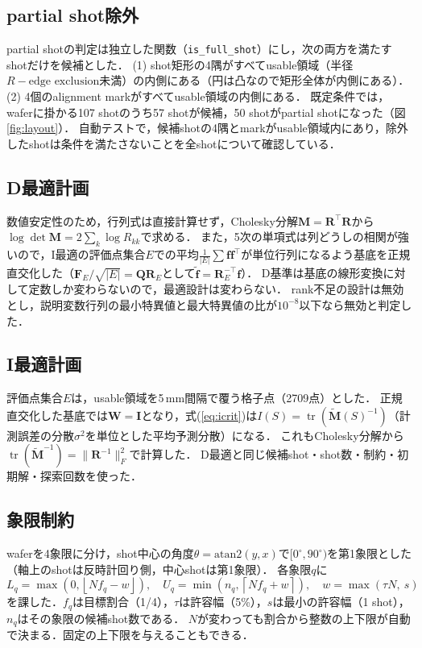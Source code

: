 \documentclass[10.5pt,a4paper]{ltjsarticle}
\DeclareMathOperator{\tr}{tr}
\begin{document}
\subsection{partial shot除外}

partial shotの判定は独立した関数（\texttt{is\_full\_shot}）にし，次の両方を満たすshotだけを候補とした．
(1) shot矩形の4隅がすべてusable領域（半径$R-\text{edge exclusion}$未満）の内側にある（円は凸なので矩形全体が内側にある）．
(2) 4個のalignment markがすべてusable領域の内側にある．
既定条件では，waferに掛かる107 shotのうち57 shotが候補，50 shotがpartial shotになった（図\ref{fig:layout}）．
自動テストで，候補shotの4隅とmarkがusable領域内にあり，除外したshotは条件を満たさないことを全shotについて確認している．

\subsection{D最適計画}

数値安定性のため，行列式は直接計算せず，Cholesky分解$\bm{M}=\bm{R}^\top\bm{R}$から$\log\det\bm{M}=2\sum_k\log R_{kk}$で求める．
また，5次の単項式は列どうしの相関が強いので，I最適の評価点集合$E$での平均$\frac{1}{|E|}\sum\bm{f}\bm{f}^\top$が単位行列になるよう基底を正規直交化した（$\bm{F}_E/\sqrt{|E|}=\bm{Q}\bm{R}_E$として$\tilde{\bm{f}}=\bm{R}_E^{-\top}\bm{f}$）．
D基準は基底の線形変換に対して定数しか変わらないので，最適設計は変わらない．
rank不足の設計は無効とし，説明変数行列の最小特異値と最大特異値の比が$10^{-8}$以下なら無効と判定した．

\subsection{I最適計画}

評価点集合$E$は，usable領域を5\,mm間隔で覆う格子点（2709点）とした．
正規直交化した基底では$\bm{W}=\bm{I}$となり，式(\ref{eq:icrit})は$I(S)=\tr(\tilde{\bm{M}}(S)^{-1})$（計測誤差の分散$\sigma^2$を単位とした平均予測分散）になる．
これもCholesky分解から$\tr(\tilde{\bm{M}}^{-1})=\|\bm{R}^{-1}\|_F^2$で計算した．
D最適と同じ候補shot・shot数・制約・初期解・探索回数を使った．

\subsection{象限制約}

waferを4象限に分け，shot中心の角度$\theta=\mathrm{atan2}(y,x)$で$[0^\circ,90^\circ)$を第1象限とした（軸上のshotは反時計回り側，中心shotは第1象限）．
各象限$q$に
\begin{equation}
  L_q=\max\!\left(0,\left\lfloor N f_q - w\right\rfloor\right),\quad
  U_q=\min\!\left(n_q,\left\lceil N f_q + w\right\rceil\right),\quad
  w=\max(\tau N,\ s)
  \label{eq:bounds}
\end{equation}
を課した．$f_q$は目標割合（1/4），$\tau$は許容幅（5\%），$s$は最小の許容幅（1 shot），$n_q$はその象限の候補shot数である．
$N$が変わっても割合から整数の上下限が自動で決まる．固定の上下限を与えることもできる．
\end{document}
